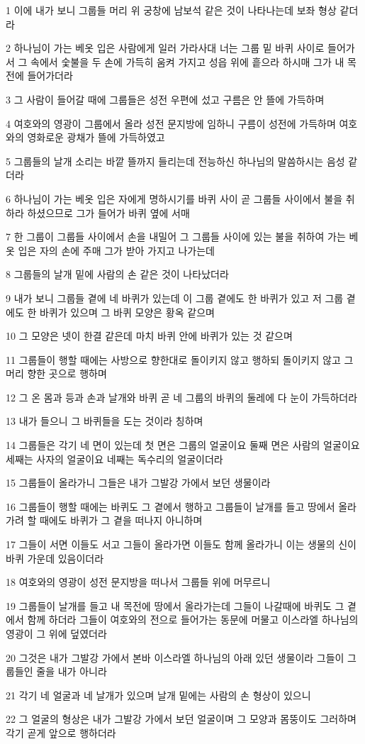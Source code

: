 \par 1 이에 내가 보니 그룹들 머리 위 궁창에 남보석 같은 것이 나타나는데 보좌 형상 같더라
\par 2 하나님이 가는 베옷 입은 사람에게 일러 가라사대 너는 그룹 밑 바퀴 사이로 들어가서 그 속에서 숯불을 두 손에 가득히 움켜 가지고 성읍 위에 흩으라 하시매 그가 내 목전에 들어가더라
\par 3 그 사람이 들어갈 때에 그룹들은 성전 우편에 섰고 구름은 안 뜰에 가득하며
\par 4 여호와의 영광이 그룹에서 올라 성전 문지방에 임하니 구름이 성전에 가득하며 여호와의 영화로운 광채가 뜰에 가득하였고
\par 5 그룹들의 날개 소리는 바깥 뜰까지 들리는데 전능하신 하나님의 말씀하시는 음성 같더라
\par 6 하나님이 가는 베옷 입은 자에게 명하시기를 바퀴 사이 곧 그룹들 사이에서 불을 취하라 하셨으므로 그가 들어가 바퀴 옆에 서매
\par 7 한 그룹이 그룹들 사이에서 손을 내밀어 그 그룹들 사이에 있는 불을 취하여 가는 베옷 입은 자의 손에 주매 그가 받아 가지고 나가는데
\par 8 그룹들의 날개 밑에 사람의 손 같은 것이 나타났더라
\par 9 내가 보니 그룹들 곁에 네 바퀴가 있는데 이 그룹 곁에도 한 바퀴가 있고 저 그룹 곁에도 한 바퀴가 있으며 그 바퀴 모양은 황옥 같으며
\par 10 그 모양은 넷이 한결 같은데 마치 바퀴 안에 바퀴가 있는 것 같으며
\par 11 그룹들이 행할 때에는 사방으로 향한대로 돌이키지 않고 행하되 돌이키지 않고 그 머리 향한 곳으로 행하며
\par 12 그 온 몸과 등과 손과 날개와 바퀴 곧 네 그룹의 바퀴의 둘레에 다 눈이 가득하더라
\par 13 내가 들으니 그 바퀴들을 도는 것이라 칭하며
\par 14 그룹들은 각기 네 면이 있는데 첫 면은 그룹의 얼굴이요 둘째 면은 사람의 얼굴이요 세째는 사자의 얼굴이요 네째는 독수리의 얼굴이더라
\par 15 그룹들이 올라가니 그들은 내가 그발강 가에서 보던 생물이라
\par 16 그룹들이 행할 때에는 바퀴도 그 곁에서 행하고 그룹들이 날개를 들고 땅에서 올라가려 할 때에도 바퀴가 그 곁을 떠나지 아니하며
\par 17 그들이 서면 이들도 서고 그들이 올라가면 이들도 함께 올라가니 이는 생물의 신이 바퀴 가운데 있음이더라
\par 18 여호와의 영광이 성전 문지방을 떠나서 그룹들 위에 머무르니
\par 19 그룹들이 날개를 들고 내 목전에 땅에서 올라가는데 그들이 나갈때에 바퀴도 그 곁에서 함께 하더라 그들이 여호와의 전으로 들어가는 동문에 머물고 이스라엘 하나님의 영광이 그 위에 덮였더라
\par 20 그것은 내가 그발강 가에서 본바 이스라엘 하나님의 아래 있던 생물이라 그들이 그룹들인 줄을 내가 아니라
\par 21 각기 네 얼굴과 네 날개가 있으며 날개 밑에는 사람의 손 형상이 있으니
\par 22 그 얼굴의 형상은 내가 그발강 가에서 보던 얼굴이며 그 모양과 몸뚱이도 그러하며 각기 곧게 앞으로 행하더라

